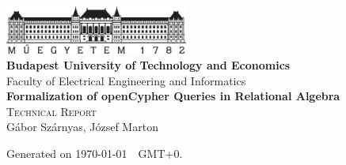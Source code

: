\begin{titlepage}
	\begin{center}
		\includegraphics[width=60mm,keepaspectratio]{figures/bme-logo}\\
		\vspace{0.3cm}
		\textbf{Budapest University of Technology and Economics}\\
		\textmd{Faculty of Electrical Engineering and Informatics}\\[5cm]
		
		\vspace{0.4cm}
		{\huge \bfseries Formalization of openCypher Queries in Relational Algebra}\\[0.8cm]
		\vspace{0.5cm}
		\textsc{\Large Technical Report}\\[4cm]
		
		{\Large Gábor Szárnyas, József Marton}\\

		
		\vfill
		{\large Generated on \yyyymmdddate \today~\currenttime~GMT+0.}
	\end{center}		
\end{titlepage}
